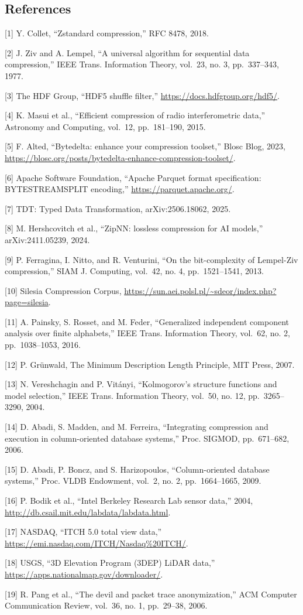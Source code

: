 \documentclass[
  11pt,
  letterpaper,
]{article}
\makeatletter
\renewcommand{\_}{\bpd@origunderscore\allowbreak}
\makeatother
\begin{document}
\hypertarget{references}{%
\subsection{References}\label{references}}

{[}1{]} Y. Collet, ``Zstandard compression,'' RFC 8478, 2018.

{[}2{]} J. Ziv and A. Lempel, ``A universal algorithm for sequential
data compression,'' IEEE Trans. Information Theory, vol.~23, no. 3,
pp.~337--343, 1977.

{[}3{]} The HDF Group, ``HDF5 shuffle filter,''
\url{https://docs.hdfgroup.org/hdf5/}.

{[}4{]} K. Masui et al., ``Efficient compression of radio
interferometric data,'' Astronomy and Computing, vol.~12, pp.~181--190,
2015.

{[}5{]} F. Alted, ``Bytedelta: enhance your compression toolset,'' Blosc
Blog, 2023,
\url{https://blosc.org/posts/bytedelta-enhance-compression-toolset/}.

{[}6{]} Apache Software Foundation, ``Apache Parquet format
specification: BYTE\_STREAM\_SPLIT encoding,''
\url{https://parquet.apache.org/}.

{[}7{]} TDT: Typed Data Transformation, arXiv:2506.18062, 2025.

{[}8{]} M. Hershcovitch et al., ``ZipNN: lossless compression for AI
models,'' arXiv:2411.05239, 2024.

{[}9{]} P. Ferragina, I. Nitto, and R. Venturini, ``On the
bit-complexity of Lempel-Ziv compression,'' SIAM J. Computing, vol.~42,
no. 4, pp.~1521--1541, 2013.

{[}10{]} Silesia Compression Corpus,
\url{https://sun.aei.polsl.pl/~sdeor/index.php?page=silesia}.

{[}11{]} A. Painsky, S. Rosset, and M. Feder, ``Generalized independent
component analysis over finite alphabets,'' IEEE Trans. Information
Theory, vol.~62, no. 2, pp.~1038--1053, 2016.

{[}12{]} P. Grünwald, The Minimum Description Length Principle, MIT
Press, 2007.

{[}13{]} N. Vereshchagin and P. Vitányi, ``Kolmogorov's structure
functions and model selection,'' IEEE Trans. Information Theory,
vol.~50, no. 12, pp.~3265--3290, 2004.

{[}14{]} D. Abadi, S. Madden, and M. Ferreira, ``Integrating compression
and execution in column-oriented database systems,'' Proc. SIGMOD,
pp.~671--682, 2006.

{[}15{]} D. Abadi, P. Boncz, and S. Harizopoulos, ``Column-oriented
database systems,'' Proc. VLDB Endowment, vol.~2, no. 2, pp.~1664--1665,
2009.

{[}16{]} P. Bodik et al., ``Intel Berkeley Research Lab sensor data,''
2004, \url{http://db.csail.mit.edu/labdata/labdata.html}.

{[}17{]} NAS\-DAQ, ``ITCH 5.0 total view data,''
\url{https://emi.nasdaq.com/ITCH/Nasdaq\%20ITCH/}.

{[}18{]} USGS, ``3D Elevation Program (3DEP) LiDAR data,''
\url{https://apps.nationalmap.gov/downloader/}.

{[}19{]} R. Pang et al., ``The devil and packet trace anonymization,''
ACM Computer Communication Review, vol.~36, no. 1, pp.~29--38, 2006.
\end{document}
